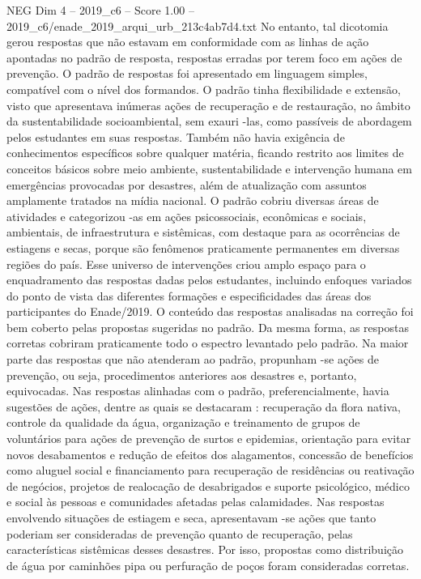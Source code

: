 \begin{textsample}{NEG Dim 4 – 2019\_c6 – Score 1.00 – 2019\_c6/enade\_2019\_arqui\_urb\_213c4ab7d4.txt}
No entanto, tal dicotomia gerou respostas que não estavam em conformidade com as linhas de ação apontadas no padrão de resposta, respostas erradas por terem foco em ações de prevenção.
O padrão de respostas foi apresentado em linguagem simples, compatível com o nível dos formandos.
O padrão tinha flexibilidade e extensão, visto que apresentava inúmeras ações de recuperação e de restauração, no âmbito da sustentabilidade socioambiental, sem exauri -las, como passíveis de abordagem pelos estudantes em suas respostas.
Também não havia exigência de conhecimentos específicos sobre qualquer matéria, ficando restrito aos limites de conceitos básicos sobre meio ambiente, sustentabilidade e intervenção humana em emergências provocadas por desastres, além de atualização com assuntos amplamente tratados na mídia nacional.
O padrão cobriu diversas áreas de atividades e categorizou -as em ações psicossociais, econômicas e sociais, ambientais, de infraestrutura e sistêmicas, com destaque para as ocorrências de estiagens e secas, porque são fenômenos praticamente permanentes em diversas regiões do país.
Esse universo de intervenções criou amplo espaço para o enquadramento das respostas dadas pelos estudantes, incluindo enfoques variados do ponto de vista das diferentes formações e especificidades das áreas dos participantes do Enade/2019.
O conteúdo das respostas analisadas na correção foi bem coberto pelas propostas sugeridas no padrão.
Da mesma forma, as respostas corretas cobriram praticamente todo o espectro levantado pelo padrão.
Na maior parte das respostas que não atenderam ao padrão, propunham -se ações de prevenção, ou seja, procedimentos anteriores aos desastres e, portanto, equivocadas.
Nas respostas alinhadas com o padrão, preferencialmente, havia sugestões de ações, dentre as quais se destacaram : recuperação da flora nativa, controle da qualidade da água, organização e treinamento de grupos de voluntários para ações de prevenção de surtos e epidemias, orientação para evitar novos desabamentos e redução de efeitos dos alagamentos, concessão de benefícios como aluguel social e financiamento para recuperação de residências ou reativação de negócios, projetos de realocação de desabrigados e suporte psicológico, médico e social às pessoas e comunidades afetadas pelas calamidades.
Nas respostas envolvendo situações de estiagem e seca, apresentavam -se ações que tanto poderiam ser consideradas de prevenção quanto de recuperação, pelas características sistêmicas desses desastres.
Por isso, propostas como distribuição de água por caminhões pipa ou perfuração de poços foram consideradas corretas.

\end{textsample}
